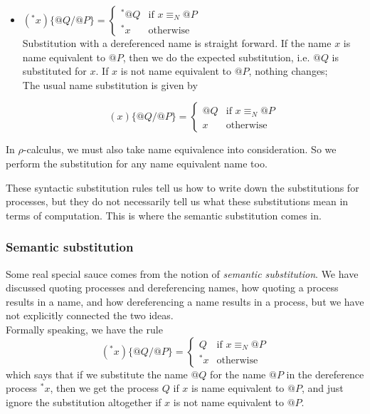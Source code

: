 \documentclass[12pt]{article}
\numberwithin{equation}{section}
\begin{document}
\begin{itemize}
\item $\displaystyle ({}^*x)\{ @Q / @P \}=\begin{cases} 
      {}^*@Q & \text{if } x \equiv_N @P \\
      {}^*x & \text{otherwise} 
   \end{cases}$ \\
Substitution with a dereferenced name is straight forward. If the name $x$ is name equivalent to $@P$, then we do the expected substitution, i.e. $@Q$ is substituted for $x$. If $x$ is not name equivalent to $@P$, nothing changes; \\

The usual name substitution is given by

\[ (x)\{ @Q / @P \}= \begin{cases} 
      @Q & \text{if } x \equiv_N @P \\
      x & \text{otherwise} 
   \end{cases} \]
\end{itemize}
In $\rho$-calculus, we must also take name equivalence into consideration. So we perform the substitution for any name equivalent name too.

These syntactic substitution rules tell us how to write down the substitutions for processes, but they do not necessarily tell us what these substitutions mean in terms of computation. This is where the semantic substitution comes in.

\subsubsection{Semantic substitution}
Some real special sauce comes from the notion of \emph{semantic substitution}. We have discussed quoting processes and dereferencing names, how quoting a process results in a name, and how dereferencing a name results in a process, but we have not explicitly connected the two ideas. \\

Formally speaking, we have the rule
\[ ({}^*x) \{ @Q / @P \} = \begin{cases} 
      Q & \text{if } x \equiv_N @P \\
      {}^*x & \text{otherwise} 
   \end{cases} \]
which says that if we substitute the name $@Q$ for the name $@P$ in the dereference process ${}^*x$, then we get the process $Q$ if $x$ is name equivalent to $@P$, and just ignore the substitution altogether if $x$ is not name equivalent to $@P$.
\end{document}
